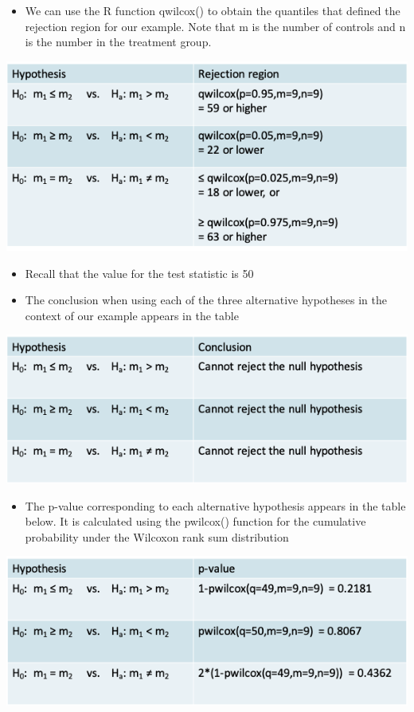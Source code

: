 \documentclass[
]{book}
\providecommand{\tightlist}{%
  \setlength{\itemsep}{0pt}\setlength{\parskip}{0pt}}
\begin{document}
\begin{itemize}
\tightlist
\item
  We can use the R function qwilcox() to obtain the quantiles that defined the rejection region for our example. Note that m is the number of controls and n is the number in the treatment group.
\end{itemize}

\includegraphics[width=0.7\linewidth]{./9_32}

\begin{itemize}
\tightlist
\item
  Recall that the value for the test statistic is 50
\item
  The conclusion when using each of the three alternative hypotheses in the context of our example appears in the table
\end{itemize}

\includegraphics[width=0.7\linewidth]{./9_33}

\begin{itemize}
\tightlist
\item
  The p-value corresponding to each alternative hypothesis appears in the table below. It is calculated using the pwilcox() function for the cumulative probability under the Wilcoxon rank sum distribution
\end{itemize}

\includegraphics[width=0.7\linewidth]{./9_34}
\end{document}
